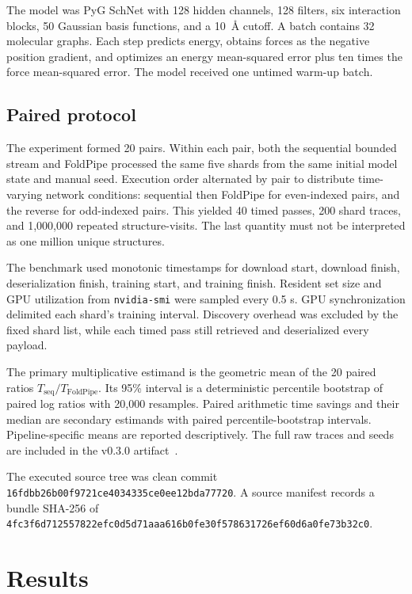 \documentclass[10pt]{article}
\begin{document}
The model was PyG SchNet with 128 hidden channels, 128 filters, six interaction
blocks, 50 Gaussian basis functions, and a 10~\AA{} cutoff.  A batch contains
32 molecular graphs.  Each step predicts energy, obtains forces as the negative
position gradient, and optimizes an energy mean-squared error plus ten times
the force mean-squared error.  The model received one untimed warm-up batch.

\subsection{Paired protocol}

The experiment formed 20 pairs.  Within each pair, both the sequential bounded
stream and FoldPipe processed the same five shards from the same initial model
state and manual seed.  Execution order alternated by pair to distribute
time-varying network conditions: sequential then FoldPipe for even-indexed
pairs, and the reverse for odd-indexed pairs.  This yielded 40 timed passes,
200 shard traces, and 1,000,000 repeated structure-visits.  The last quantity
must not be interpreted as one million unique structures.

The benchmark used monotonic timestamps for download start, download finish,
deserialization finish, training start, and training finish.  Resident set size
and GPU utilization from \texttt{nvidia-smi} were sampled every 0.5 s.  GPU
synchronization delimited each shard's training interval.  Discovery overhead
was excluded by the fixed shard list, while each timed pass still retrieved and
deserialized every payload.

The primary multiplicative estimand is the geometric mean of the 20 paired
ratios $T_{\mathrm{seq}}/T_{\mathrm{FoldPipe}}$.  Its 95\% interval is a
deterministic percentile bootstrap of paired log ratios with 20,000 resamples.
Paired arithmetic time savings and their median are secondary estimands with
paired percentile-bootstrap intervals.  Pipeline-specific means are reported
descriptively.  The full raw traces and seeds are included in the v0.3.0
artifact~\cite{khatri2026foldpipe}.

The executed source tree was clean commit
\texttt{16fdbb26b00f9721ce4034335ce0ee12bda77720}.  A source manifest records a
bundle SHA-256 of
\texttt{4fc3f6d712557822efc0d5d71aaa616b0fe30f578631726ef60d6a0fe73b32c0}.

\section{Results}
\end{document}
